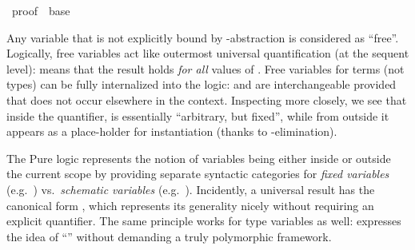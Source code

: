 %
\begin{isabellebody}%
\def\isabellecontext{proof}%
%
\isadelimtheory
\isanewline
\isanewline
\isanewline
%
\endisadelimtheory
%
\isatagtheory
{}\isamarkupfalse%
\ {\isachardoublequoteopen}proof{\isachardoublequoteclose}\ \ base\ %
\endisatagtheory
{\isafoldtheory}%
%
\isadelimtheory
%
\endisadelimtheory
%
\isamarkuptrue%
%
\isamarkuptrue%
%
\begin{isamarkuptext}%
Any variable that is not explicitly bound by \isa{{\isasymlambda}}-abstraction
  is considered as ``free''.  Logically, free variables act like
  outermost universal quantification (at the sequent level):  means that the result
  holds \emph{for all} values of .  Free variables for
  terms (not types) can be fully internalized into the logic:  and  are interchangeable provided that
   does not occur elsewhere in the context.  Inspecting
   more closely, we see that inside the
  quantifier,  is essentially ``arbitrary, but fixed'',
  while from outside it appears as a place-holder for instantiation
  (thanks to \isa{{\isasymAnd}}-elimination).

  The Pure logic represents the notion of variables being either
  inside or outside the current scope by providing separate syntactic
  categories for \emph{fixed variables} (e.g.\ ) vs.\
  \emph{schematic variables} (e.g.\ ).  Incidently, a
  universal result  has the canonical form , which represents its generality nicely without requiring
  an explicit quantifier.  The same principle works for type variables
  as well:  expresses the idea of ``'' without demanding a truly polymorphic framework.


\end{isamarkuptext}
\end{isabellebody}
